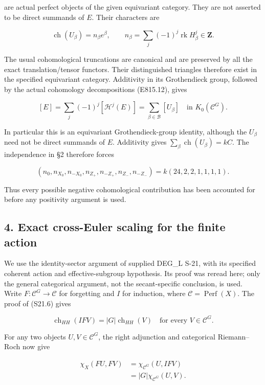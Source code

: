 are actual perfect objects of the given equivariant category. They are
not asserted to be direct summands of \(E\). Their characters are

\[
 \operatorname{ch}(U_\beta)=n_\beta e^\beta,
 \qquad n_\beta=\sum_j(-1)^j\operatorname{rk}H^j_\beta\in\mathbf Z.
 \tag{E815.14}
\]

The usual cohomological truncations are canonical and are preserved by
all the exact translation/tensor functors. Their distinguished triangles
therefore exist in the specified equivariant category. Additivity in its
Grothendieck group, followed by the actual cohomology decompositions
(E815.12), gives

\[
 [E]=\sum_j(-1)^j[\mathcal H^j(E)]
      =\sum_{\beta\in\mathcal B}[U_\beta]
      \quad\text{in }K_0(\mathcal C^G).
 \tag{E815.14a}
\]

In particular this is an equivariant Grothendieck-group identity,
although the \(U_\beta\) need not be direct summands of \(E\).
Additivity gives \(\sum_\beta\operatorname{ch}(U_\beta)=kC\). The
independence in §2 therefore forces

\[
 (n_0,n_{X_0},n_{-X_0},n_{Z_+},n_{-Z_+},n_{Z_-},n_{-Z_-})
    =k(24,2,2,1,1,1,1).
 \tag{E815.15}
\]

Thus every possible negative cohomological contribution has been
accounted for before any positivity argument is used.

\subsection{4. Exact cross-Euler scaling for the finite
action}\label{SF-E815-exact-cross-euler-scaling-for-the-finite-action}

We use the identity-sector argument of supplied DEG\_L S-21, with its
specified coherent action and effective-subgroup hypothesis. Its proof
was reread here; only the general categorical argument, not the
secant-specific conclusion, is used. Write
\(F:\mathcal C^G\to\mathcal C\) for forgetting and \(I\) for induction,
where \(\mathcal C=\operatorname{Perf}(X)\). The proof of (S21.6) gives

\[
 \operatorname{ch}_{HH}(IFV)=|G|\operatorname{ch}_{HH}(V)
 \quad\text{for every }V\in\mathcal C^G.
\]

For any two objects \(U,V\in\mathcal C^G\), the right adjunction and
categorical Riemann--Roch now give

\[
 \begin{split}
 \chi_X(FU,FV)
 &=\chi_{\mathcal C^G}(U,IFV)\\
 &=|G|\chi_{\mathcal C^G}(U,V).
 \end{split}
 \tag{E815.16}
\]

